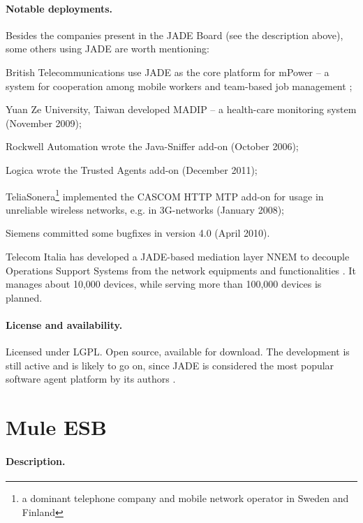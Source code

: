 \documentclass[a4paper]{report}
\begin{document}
\paragraph{Notable deployments.} Besides the companies present in the JADE Board (see the description above), some others using JADE are worth mentioning:
\begin{compactitem}
\item British Telecommunications use JADE as the core platform for mPower -- a system for cooperation among mobile workers and team-based job management \cite{bellifemine2008jade};
\item Yuan Ze University, Taiwan developed MADIP -- a health-care monitoring system \cite{su2011jade} (November 2009);
\item Rockwell Automation wrote the Java-Sniffer add-on (October 2006);
\item Logica wrote the Trusted Agents add-on (December 2011);
\item TeliaSonera\footnote{a dominant telephone company and mobile network operator in Sweden and Finland} implemented the CASCOM HTTP MTP add-on for usage in unreliable wireless networks, e.g. in 3G-networks (January 2008);
\item Siemens committed some bugfixes in version 4.0 (April 2010).
\end{compactitem}
Telecom Italia has developed a JADE-based mediation layer NNEM to decouple Operations Support Systems from the network equipments and functionalities \cite{bellifemine2008jade}. It manages about 10,000 devices, while serving more than 100,000 devices is planned.


\paragraph{License and availability.} Licensed under LGPL. Open source, available for download. The development is still active and is likely to go on, since JADE is considered the most popular software agent platform by its authors \cite{bellifemine2008jade}.




\section{Mule ESB}

\paragraph{Description.}
\end{document}
